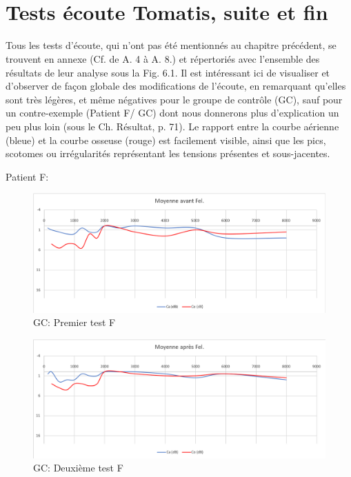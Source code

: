 \section{Tests écoute Tomatis\textsuperscript \textregistered, suite et fin }

Tous les  tests d'écoute, qui n'ont pas été mentionnés au chapitre précédent, se trouvent en annexe (Cf. 
de A. 4 à A. 8.) et 
répertoriés avec l'ensemble des résultats de leur analyse sous la Fig. 6.1.
Il est intéressant ici de visualiser et d'observer de façon globale des modifications de l'écoute, en 
remarquant qu'elles sont très légères, et même négatives pour le groupe de contrôle (GC), sauf pour un 
contre-exemple (Patient F/ GC) dont nous donnerons plus d'explication un peu plus loin (sous le Ch. 
Résultat, p. 71).
Le rapport entre la courbe aérienne (bleue) et la courbe osseuse (rouge) est facilement visible, ainsi que 
les pics, scotomes ou irrégularités représentant les tensions présentes et sous-jacentes.

Patient F:
\begin{figure}[th]
	\centering
	\includegraphics[width=0.7\linewidth]{images/graphiques/moyavFEL.png}
	\caption[GC: Patient Fe: 1° test]{GC: Premier test F}
\end{figure}
\begin{figure}[th]
	\centering
	\includegraphics[width=0.7\linewidth]{images/graphiques/moyaprFEL.png}
	\caption[GC: Patient Fe: 2° test]{GC: Deuxième test F}
\end{figure}
 


